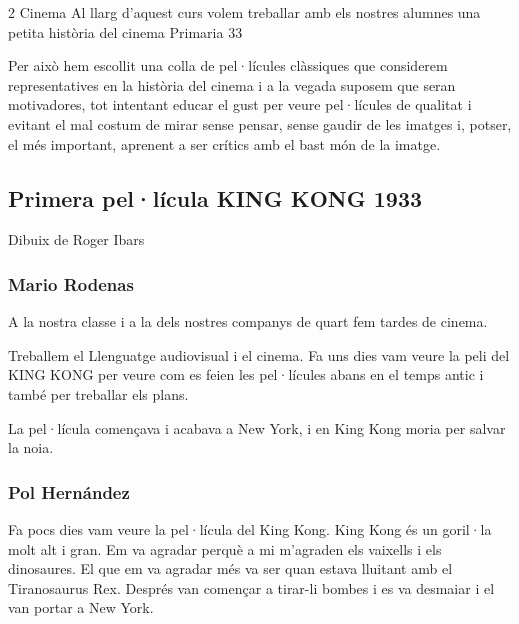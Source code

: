 %
%
\begin{news}
{2} %
{Cinema}
{Al llarg d’aquest curs volem treballar amb els nostres alumnes una petita història del cinema}
{Primaria}
{33} %

Per això hem escollit una colla de pel·lícules clàssiques que considerem representatives en la història del cinema i a la vegada suposem que  seran motivadores, tot intentant educar el gust per veure pel·lícules de qualitat i evitant el mal costum de mirar sense pensar, sense gaudir de  les imatges i, potser, el més important, aprenent a ser crítics amb el bast món de la imatge.

\subsection*{Primera pel·lícula KING KONG 1933}

\noindent{}

Dibuix de Roger Ibars

\subsubsection*{Mario Rodenas}

A la nostra classe i a la dels nostres companys de quart fem tardes de cinema.

Treballem el Llenguatge audiovisual i el cinema. Fa uns dies vam veure la peli del KING KONG per veure com es feien les pel·lícules abans en el temps antic i també per treballar els plans.

La pel·lícula començava i acabava a New York, i en King Kong moria per salvar la noia.



\noindent{}

\subsubsection*{Pol Hernández}
Fa pocs dies vam veure la pel·lícula del King Kong. 
King Kong és un goril·la molt alt i gran.
Em va agradar perquè a mi m’agraden els vaixells i els dinosaures. El que em va agradar més va ser quan estava lluitant amb el Tiranosaurus  Rex.
Després van començar a tirar-li bombes i es va desmaiar i el van portar a New York.




\end{news}
